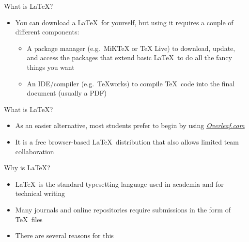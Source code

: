 \documentclass{beamer} %
\begin{document}
\begin{frame}{What is \LaTeX?}

\begin{itemize}
	\item You can download a \LaTeX\ for yourself, but using it requires a couple of different components:
	\begin{itemize}
		\item A package manager (e.g.~MiKTeX or TeX Live) to download, update, and access the packages that extend basic \LaTeX\ to do all the fancy things you want
		\item An IDE/compiler (e.g.~TeXworks) to compile \TeX\ code into the final document (usually a PDF)
	\end{itemize}
\end{itemize}

\end{frame}

\begin{frame}{What is \LaTeX?}

\begin{itemize}
	\item As an easier alternative, most students prefer to begin by using \href{https://www.overleaf.com/}{\textit{Overleaf.com}}
	\item It is a free browser-based \LaTeX\ distribution that also allows limited team collaboration
\end{itemize}

\end{frame}

\begin{frame}{Why is \LaTeX?}

\begin{itemize}
	\item \LaTeX\ is the standard typesetting language used in academia and for technical writing
	\item Many journals and online repositories require submissions in the form of \TeX\ files
	\item There are several reasons for this
\end{itemize}

\end{frame}
\end{document}
